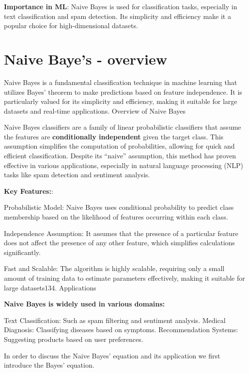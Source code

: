 \documentclass[
  12 pt,
  a4paper,
]{book}
\numberwithin{equation}{section}
\theoremstyle{plain}      %
\theoremstyle{definition} %
\theoremstyle{remark}     %
\theoremstyle{note}         %
\begin{document}
\textbf{Importance in ML}: Naive Bayes is used for classification tasks,
especially in text classification and spam detection. Its simplicity and
efficiency make it a popular choice for high-dimensional datasets.

\vspace*{\fill}

\newpage

\hypertarget{naive-bayes---overview}{%
\section{Naive Baye's - overview}\label{naive-bayes---overview}}

Naive Bayes is a fundamental classification technique in machine
learning that utilizes Bayes' theorem to make predictions based on
feature independence. It is particularly valued for its simplicity and
efficiency, making it suitable for large datasets and real-time
applications. Overview of Naive Bayes

Naive Bayes classifiers are a family of linear probabilistic classifiers
that assume the features are \textbf{conditionally independent} given
the target class. This assumption simplifies the computation of
probabilities, allowing for quick and efficient classification. Despite
its ``naive'' assumption, this method has proven effective in various
applications, especially in natural language processing (NLP) tasks like
spam detection and sentiment analysis.

\textbf{Key Features:}:

Probabilistic Model: Naive Bayes uses conditional probability to predict
class membership based on the likelihood of features occurring within
each class.

Independence Assumption: It assumes that the presence of a particular
feature does not affect the presence of any other feature, which
simplifies calculations significantly.

Fast and Scalable: The algorithm is highly scalable, requiring only a
small amount of training data to estimate parameters effectively, making
it suitable for large datasets134. Applications

\textbf{Naive Bayes is widely used in various domains:}

Text Classification: Such as spam filtering and sentiment analysis.
Medical Diagnosis: Classifying diseases based on symptoms.
Recommendation Systems: Suggesting products based on user preferences.

In order to discuss the Naive Bayes' equation and its application we
first introduce the Bayes' equation.
\end{document}
